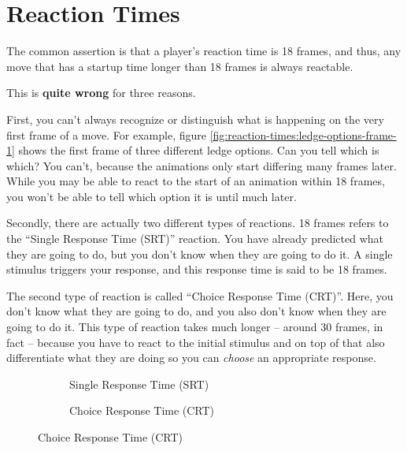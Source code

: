 \section{Reaction Times}
\label{sec:reaction-times}

The common assertion is that a player's  reaction  time is 18 frames, and thus,
any move that has a startup time longer than 18  frames  is  always  reactable.

This is \textbf{quite wrong} for three reasons.

First, you can't always recognize  or distinguish what is happening on the very
first      frame      of       a       move.      For      example,      figure
\ref{fig:reaction-times:ledge-options-frame-1}  shows the first frame of  three
different  ledge options. Can you tell which is which? You can't,  because  the
animations only  start  differing  many  frames later. While you may be able to
react to the start  of an animation within 18 frames, you won't be able to tell
which option it is until much later.

Secondly, there are actually two different types of reactions. 18 frames refers
to the ``Single Response Time (SRT)'' reaction. You have already predicted what
they are going to do, but you don't know when they are going to do it. A single
stimulus  triggers your response, and this response  time  is  said  to  be  18
frames.

The second type of reaction is called ``Choice Response Time (CRT)''. Here, you
don't know what they are  going  to  do,  and you also don't know when they are
going to do it. This type of reaction takes much longer -- around 30 frames, in
fact -- because you have to react  to  the  initial stimulus and on top of that
also differentiate what they are doing  so you can \emph{choose} an appropriate
response.

\begin{figure}[ht]
    \centering
    \begin{subfigure}[t]{0.48\linewidth}
        \caption{Single Response Time (SRT)}
    \end{subfigure}
    \begin{subfigure}[t]{0.48\linewidth}
        \caption{Choice Response Time (CRT)}
    \end{subfigure}
\end{figure}
